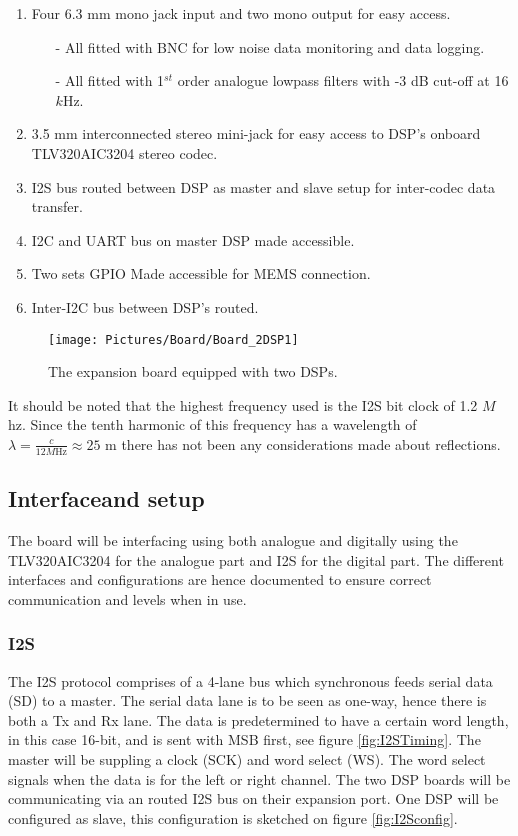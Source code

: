 \begin{enumerate}
	\item Four 6.3 mm mono jack input and two mono output for easy access.
	\begin{itemize}
		\item[-] All fitted with BNC for low noise data monitoring and data logging.
		\item[-] All fitted with 1$^{st}$ order analogue lowpass filters with -3 dB cut-off at 16 $k$Hz.
	\end{itemize}
	\item 3.5 mm interconnected stereo mini-jack for easy access to DSP's onboard TLV320AIC3204 stereo codec.
	\item I2S bus routed between DSP as master and slave setup for inter-codec data transfer.
	\item I2C and UART bus on master DSP made accessible.
	\item Two sets GPIO Made accessible for MEMS connection.
	\item Inter-I2C bus between DSP's routed. 
\end{enumerate}

\begin{figure}[H]
	\centering
	\texttt{[image: Pictures/Board/Board\_2DSP1]}	
	\caption{The expansion board equipped with two DSPs.}
	\label{fig:PCBboard}
\end{figure}

It should be noted that the highest frequency used is the I2S bit clock of 1.2 $M$hz. Since the tenth harmonic of this frequency has a wavelength of $\lambda=\frac{c}{12M \text{Hz}}\approx25\text{ m}$ there has not been any considerations made about reflections.


\subsection{Interfaceand setup}\label{subsec:Interface}

The board will be interfacing using both analogue and digitally using the TLV320AIC3204 for the analogue part and I2S for the digital part. The different interfaces and configurations are hence documented to ensure correct communication and levels when in use. 

\subsubsection*{I2S}

The I2S protocol comprises of a 4-lane bus which synchronous feeds serial data (SD) to a master. The serial data lane is to be seen as one-way, hence there is both a Tx and Rx lane. The data is predetermined to have a certain word length, in this case 16-bit, and is sent with MSB first, see figure \ref{fig:I2STiming}. The master will be suppling a clock (SCK) and word select (WS). The word select signals when the data is for the left or right channel. The two DSP boards will be communicating via an routed I2S bus on their expansion port. One DSP will be configured as slave, this configuration is sketched on figure \ref{fig:I2Sconfig}. 


